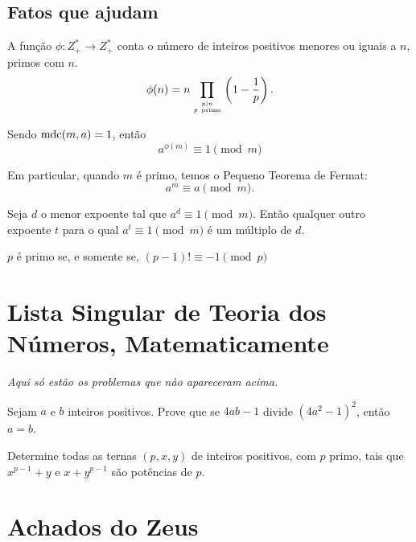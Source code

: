 \documentclass[10pt,a4paper]{article}
\begin{document}
	\subsection*{Fatos que ajudam}

	\begin{defn}
		A função $\phi\colon Z^*_+\longrightarrow Z^*_+$ conta o número de inteiros positivos menores ou iguais a $n$, primos com $n$.  $$\phi(n)=n\prod_{{p \mid n\atop p {\rm\ primo}}} \left(1-{1\over p}\right).$$
	\end{defn}

	\begin{thm}
	Sendo $\operatorname{mdc}(m,a)=1$, então
	$$a^{\phi(m)}\equiv1\pmod{m}$$

	Em particular, quando $m$ é primo, temos o Pequeno Teorema de Fermat:
	$$a^m\equiv a\pmod{m}.$$
	\end{thm}

	\begin{defn}
		Seja $d$ o menor expoente tal que $a^d\equiv1 \pmod{m}$. Então qualquer outro expoente $t$ para o qual $a^t\equiv1\pmod{m}$ é um múltiplo de $d$.
	\end{defn}

	\begin{thm}
		$p$ é primo se, e somente se, $(p-1)!\equiv-1 \pmod{p}$
	\end{thm}

	\newpage
	\section{Lista Singular de Teoria dos Números, Matematicamente}

	\emph{Aqui só estão os problemas que nào apareceram acima.}

	\begin{prob}
		Sejam $a$ e $b$ inteiros positivos. Prove que se $4ab - 1$ divide $(4a^2 - 1)^2$, então $a = b$.
	\end{prob}

	\begin{prob}
		Determine todas as ternas $(p, x, y)$ de inteiros positivos, com $p$ primo, tais que $x^{p-1} + y$ e $x + y^{p-1}$ são potências de $p$.
	\end{prob}

	\newpage
	\section{Achados do Zeus}

\end{document}

